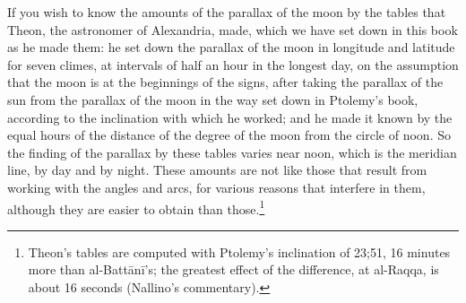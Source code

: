 \documentclass[11pt]{article}
\begin{document}
\par If you wish to know the amounts of the parallax of the moon by the tables that Theon, the astronomer of Alexandria, made, which we have set down in this book as he made them: he set down the parallax of the moon in longitude and latitude for seven climes, at intervals of half an hour in the longest day, on the assumption that the moon is at the beginnings of the signs, after taking the parallax of the sun from the parallax of the moon in the way set down in Ptolemy's book, according to the inclination with which he worked; and he made it known by the equal hours of the distance of the degree of the moon from the circle of noon. So the finding of the parallax by these tables varies near noon, which is the meridian line, by day and by night. These amounts are not like those that result from working with the angles and arcs, for various reasons that interfere in them, although they are easier to obtain than those.\footnote{Theon's tables are computed with Ptolemy's inclination of 23;51, 16 minutes more than al-Battānī's; the greatest effect of the difference, at al-Raqqa, is about 16 seconds (Nallino's commentary).}\par
\end{document}

